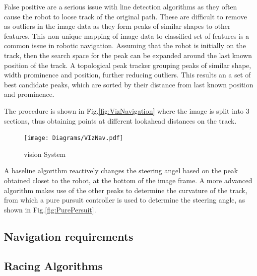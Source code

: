         False positive are a serious issue with line detection algorithms as they often cause the robot to loose track of the original path. 
        These are difficult to remove as outliers in the image data as they form peaks of similar shapes to other features. This non unique mapping 
        of image data to classified set of features is a common issue in robotic navigation. 
        Assuming that the robot is initially on the track, then the search space for the peak can be expanded around the last known position of the track. 
        A topological peak tracker grouping peaks of similar shape, width prominence and position, further reducing outliers. 
        This results an a set of best candidate peaks, which are sorted by their distance from last known position and prominence. 

        The procedure is shown in Fig.\ref{fig:VizNavigation} where the image is split into 3 sections, thus obtaining points at different lookahead distances 
        on the track. 

        \begin{figure}[H]
            \centering
            \texttt{[image: Diagrams/VIzNav.pdf]}
            \caption{vision System}
            \label{fig:Vision}
        \end{figure}

        A baseline algorithm reactively changes the steering angel based on the peak obtained closet to the robot, at the bottom of the image frame.  
        A more advanced algorithm makes use of the other peaks to determine the curvature of the track, from which a pure pursuit controller is used to
        determine the steering angle, as shown in Fig.\ref{fig:PurePersuit}.


        

        \subsection{Navigation requirements}



        \subsection{Racing Algorithms}
